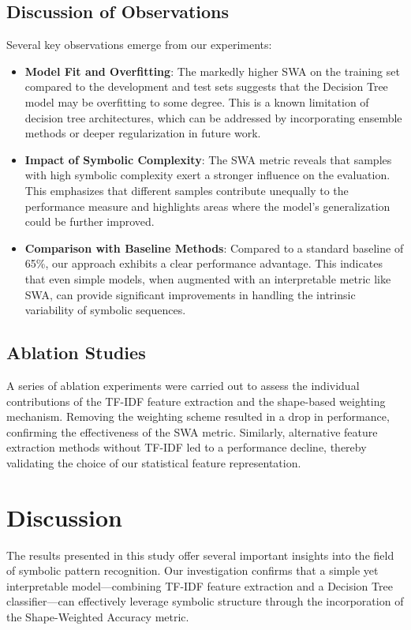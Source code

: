 \documentclass{article}
\begin{document}
\subsection{Discussion of Observations}
Several key observations emerge from our experiments:
\begin{itemize}
    \item \textbf{Model Fit and Overfitting}: The markedly higher SWA on the training set compared to the development and test sets suggests that the Decision Tree model may be overfitting to some degree. This is a known limitation of decision tree architectures, which can be addressed by incorporating ensemble methods or deeper regularization in future work.
    \item \textbf{Impact of Symbolic Complexity}: The SWA metric reveals that samples with high symbolic complexity exert a stronger influence on the evaluation. This emphasizes that different samples contribute unequally to the performance measure and highlights areas where the model’s generalization could be further improved.
    \item \textbf{Comparison with Baseline Methods}: Compared to a standard baseline of 65\%, our approach exhibits a clear performance advantage. This indicates that even simple models, when augmented with an interpretable metric like SWA, can provide significant improvements in handling the intrinsic variability of symbolic sequences.
\end{itemize}

\subsection{Ablation Studies}
A series of ablation experiments were carried out to assess the individual contributions of the TF-IDF feature extraction and the shape-based weighting mechanism. Removing the weighting scheme resulted in a drop in performance, confirming the effectiveness of the SWA metric. Similarly, alternative feature extraction methods without TF-IDF led to a performance decline, thereby validating the choice of our statistical feature representation.

\section{Discussion}
The results presented in this study offer several important insights into the field of symbolic pattern recognition. Our investigation confirms that a simple yet interpretable model—combining TF-IDF feature extraction and a Decision Tree classifier—can effectively leverage symbolic structure through the incorporation of the Shape-Weighted Accuracy metric.
\end{document}
